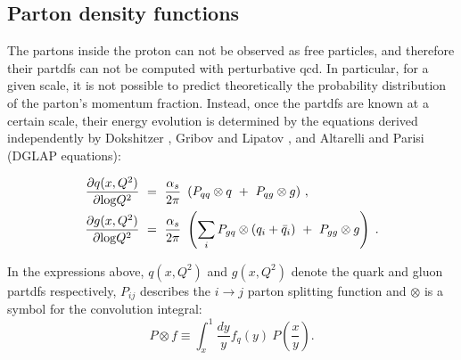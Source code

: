 


\subsection{Parton density functions}
\label{sec:protpdf}

The partons inside the proton can not be observed as free particles, and therefore their \glspl{partdf} can not be computed with
perturbative \gls{qcd}. In particular, for a given scale, it is not possible to predict theoretically the probability distribution 
of the parton's momentum fraction. Instead, once the \glspl{partdf} are known at a certain scale, their energy evolution is 
determined by the equations derived independently by Dokshitzer \cite{Dokshitzer:1977sg} , Gribov and Lipatov \cite{Gribov:1972ri}, and Altarelli and Parisi \cite{ALTARELLI1977298} (DGLAP equations):

\begin{equation}
\begin{aligned}
\frac{\partial q(x,Q^2)}{\partial {\rm log}Q^2}~&=~\frac{\alpha_s}{2\pi}~\left( P_{qq} \otimes q~+~P_{qg} \otimes g \right) \, ,\\
\frac{\partial g(x,Q^2)}{\partial {\rm log}Q^2}~&=~\frac{\alpha_s}{2\pi}~\left( \sum_i P_{gq} \otimes (q_i+\bar{q}_i)~+~P_{gg} \otimes g \right) \; .
\label{eq:glap1}
\end{aligned}
\end{equation}

\noindent In the expressions above, $q(x,Q^2)$ and $g(x,Q^2)$ denote the quark and gluon \glspl{partdf} respectively, 
$P_{ij}$ describes the $i \to j$ parton splitting function
and $\otimes$ is a symbol for the convolution integral:
\begin{equation}
P \otimes f \equiv \int^1_x\frac{dy}{y}f_q(y)~P\left(\frac{x}{y}\right).
\end{equation}


